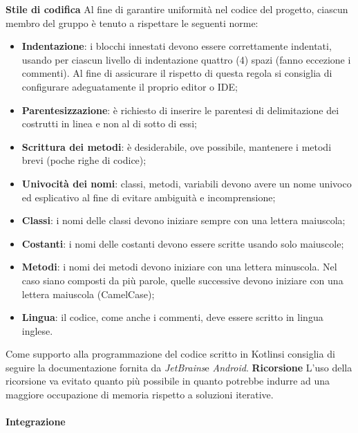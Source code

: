 			\textbf{Stile di codifica} \newline \newline
			Al fine di garantire uniformità nel codice del progetto, ciascun membro del gruppo è
			tenuto a rispettare le seguenti norme:
			\begin{itemize}
				\item \textbf{Indentazione}: i blocchi innestati devono essere correttamente indentati, usando per ciascun livello di indentazione quattro (4) spazi (fanno eccezione i commenti). Al fine di assicurare il rispetto di questa regola si consiglia di configurare adeguatamente il proprio editor o IDE;
				\item \textbf{Parentesizzazione}: è richiesto di inserire le parentesi di delimitazione dei costrutti in linea e non al di sotto di essi;
				\item \textbf{Scrittura dei metodi}: è desiderabile, ove possibile, mantenere i metodi brevi (poche righe di codice);
				\item \textbf{Univocità dei nomi}: classi, metodi, variabili devono avere un nome univoco	 ed esplicativo al fine di evitare ambiguità e incomprensione;
				\item \textbf{Classi}: i nomi delle classi devono iniziare sempre con una lettera maiuscola;
				\item \textbf{Costanti}: i nomi delle costanti devono essere scritte usando solo maiuscole;
				\item \textbf{Metodi}: i nomi dei metodi devono iniziare con una lettera minuscola. Nel caso
				siano composti da più parole, quelle successive devono iniziare con una lettera maiuscola (CamelCase\glo{});
				\item \textbf{Lingua}: il codice, come anche i commenti, deve essere scritto in lingua inglese.
			\end{itemize}
			Come supporto alla programmazione del codice scritto in Kotlin\glosp si consiglia di seguire la documentazione fornita da \textit{JetBrains}\glosp e \textit{Android}\glo. \newline \newline
			\textbf{Ricorsione} \newline \newline
			L'uso della ricorsione va evitato quanto più possibile in  quanto  potrebbe
			indurre  ad  una  maggiore  occupazione  di  memoria  rispetto  a  soluzioni
			iterative.
			\paragraph{Integrazione}
			
